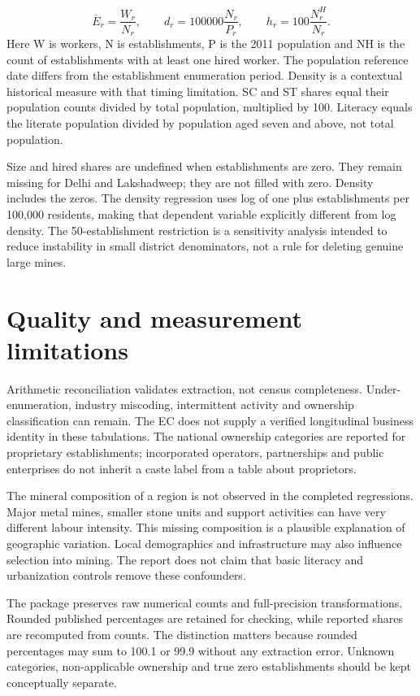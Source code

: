 \documentclass[11pt,a4paper]{report}
\begin{document}
\[
\overline E_r=\frac{W_r}{N_r},\qquad
d_r=100000\frac{N_r}{P_r},\qquad
h_r=100\frac{N_r^{H}}{N_r}.
\]
Here W is workers, N is establishments, P is the 2011 population and NH is the count of establishments with at least one hired worker. The population reference date differs from the establishment enumeration period. Density is a contextual historical measure with that timing limitation. SC and ST shares equal their population counts divided by total population, multiplied by 100. Literacy equals the literate population divided by population aged seven and above, not total population.

Size and hired shares are undefined when establishments are zero. They remain missing for Delhi and Lakshadweep; they are not filled with zero. Density includes the zeros. The density regression uses log of one plus establishments per 100,000 residents, making that dependent variable explicitly different from log density. The 50-establishment restriction is a sensitivity analysis intended to reduce instability in small district denominators, not a rule for deleting genuine large mines.

\section{Quality and measurement limitations}
Arithmetic reconciliation validates extraction, not census completeness. Under-enumeration, industry miscoding, intermittent activity and ownership classification can remain. The EC does not supply a verified longitudinal business identity in these tabulations. The national ownership categories are reported for proprietary establishments; incorporated operators, partnerships and public enterprises do not inherit a caste label from a table about proprietors.

The mineral composition of a region is not observed in the completed regressions. Major metal mines, smaller stone units and support activities can have very different labour intensity. This missing composition is a plausible explanation of geographic variation. Local demographics and infrastructure may also influence selection into mining. The report does not claim that basic literacy and urbanization controls remove these confounders.

The package preserves raw numerical counts and full-precision transformations. Rounded published percentages are retained for checking, while reported shares are recomputed from counts. The distinction matters because rounded percentages may sum to 100.1 or 99.9 without any extraction error. Unknown categories, non-applicable ownership and true zero establishments should be kept conceptually separate.
\end{document}

